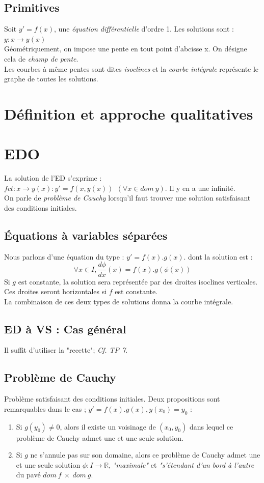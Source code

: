 \documentclass	[11pt, a4paper, openany]{book}
\begin{document}
\subsection{Primitives}
Soit $y' = f(x)$, une \textit{équation différentielle} d'ordre 1. Les solutions sont : $y : x \rightarrow y(x)$\\
Géométriquement, on impose une pente en tout point d'abcisse x. On désigne cela de \textit{champ de pente}.\\
Les courbes à même pentes sont dites \textit{isoclines} et la \textit{courbe intégrale} représente le graphe de toutes les solutions.

\section{Définition et approche qualitatives}
\section{EDO}
La solution de l'ED s'exprime : $fct : x \rightarrow y(x) : y' = f(x, y(x))\ \ (\forall x \in dom\ y)$. Il y en a une infinité.\\
On parle de \textit{problème de Cauchy} lorsqu'il faut trouver une solution satisfaisant des conditions initiales.

\subsection{Équations à variables séparées}
Nous parlons d'une équation du type : $y' = f(x).g(x)$. dont la solution est : $$\forall x \in I, \frac{d \phi}{dx}(x) = f(x).g(\phi (x))$$
Si $g$ est constante, la solution sera représentée par des droites isoclines verticales. Ces droites seront horizontales si $f$ est constante.\\
La combinaison de ces deux types de solutions donna la courbe intégrale. 

\subsection{ED à VS : Cas général}
Il suffit d'utiliser la "recette"; \textit{Cf. TP 7}.

\subsection{Problème de Cauchy}
Problème satisfaisant des conditions initiales. Deux propositions sont remarquables dans le cas ; $y' = f(x).g(x), y(x_0) = y_0$ :
\begin{enumerate}
\item Si $g(y_0) \neq 0$, alors il existe un voisinage de $(x_0,y_0)$ dans lequel ce problème de Cauchy admet une et une seule solution.
\item Si $g$ ne s'annule pas sur son domaine, alors ce problème de Cauchy admet une et une seule solution $\phi : I \rightarrow \mathbb{R}$, \textit{"maximale"} et \textit{"s'étendant d'un bord à l'autre} du pavé $dom\ f\ \times\ dom\ g$.
\end{enumerate}
\end{document}
